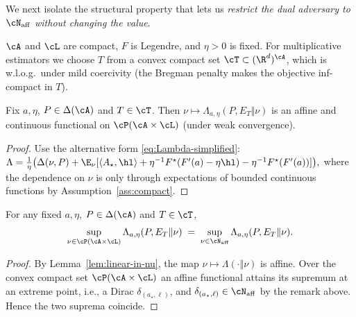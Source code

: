 We next isolate the structural property that lets us \emph{restrict the dual adversary to $\cN_{\mathrm{aff}}$ without changing the value}.

\begin{assumption}\label{ass:compact}
    $\cA$ and $\cL$ are compact, $F$ is Legendre, and $\eta>0$ is fixed.
    For multiplicative estimators we choose $T$ from a convex compact set $\cT\subset(\R^d)^{\cA}$,
    which is w.l.o.g.\ under mild coercivity (the Bregman penalty makes the objective inf-compact in $T$).
\end{assumption}

\begin{lemma}\label{lem:linear-in-nu}
    Fix $a,\eta$, $P\in\Delta(\cA)$ and $T\in\cT$. Then
    $\nu\mapsto \Lambda_{a,\eta}(P,E_T\Vert \nu)$ is an affine and continuous functional on $\cP(\cA\times\cL)$ (under weak convergence).
\end{lemma}

\begin{proof}
    Use the alternative form \eqref{eq:Lambda-simplified}:
    \(
    \Lambda = \tfrac{1}{\eta}\big(\Delta(\nu,P) + \E_\nu[\langle A_\star,\hl\rangle + \eta^{-1}F^\star(F'(a)-\eta\hl) - \eta^{-1}F^\star(F'(a))]\big),
    \)
    where the dependence on $\nu$ is only through expectations of bounded continuous functions by Assumption~\ref{ass:compact}.
\end{proof}

\begin{proposition}\label{prop:sup-over-aff}
    For any fixed $a,\eta$, $P\in\Delta(\cA)$ and $T\in\cT$,
    \[
        \sup_{\nu\in\cP(\cA\times\cL)} \Lambda_{a,\eta}(P,E_T\Vert \nu)
        \;=\;
        \sup_{\nu\in\cN_{\mathrm{aff}}} \Lambda_{a,\eta}(P,E_T\Vert \nu).
    \]
\end{proposition}

\begin{proof}
    By Lemma~\ref{lem:linear-in-nu}, the map $\nu\mapsto \Lambda(\cdot\Vert\nu)$ is affine.
    Over the convex compact set $\cP(\cA\times\cL)$ an affine functional attains its supremum at an extreme point, i.e., a Dirac $\delta_{(a_\star,\ell)}$,
    and $\delta_{(a_\star,\ell)}\in\cN_{\mathrm{aff}}$ by the remark above.
    Hence the two suprema coincide.
\end{proof}

